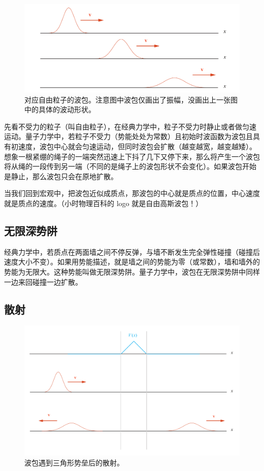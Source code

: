 \begin{figure}[ht]
\centering
\includegraphics[width=14cm]{./figures/QM02.pdf}
\caption{对应自由粒子的波包。注意图中波包仅画出了振幅，没画出上一张图中的具体的波动形状。} \label{QM0_fig2}
\end{figure}

先看不受力的粒子（叫自由粒子），在经典力学中，粒子不受力时静止或者做匀速运动。量子力学中，若粒子不受力（势能处处为常数）且初始时波函数为波包且具有初速度，波包中心就会匀速运动，但同时波包会扩散（越变越宽，越变越矮）。想象一根紧绷的绳子的一端突然迅速上下抖了几下又停下来，那么将产生一个波包将从绳的一段传到另一端（不同的是绳子上的波包形状不会变化）。如果波包开始是静止，那么波包只会在原地扩散。

当我们回到宏观中，把波包近似成质点，那波包的中心就是质点的位置，中心速度就是质点的速度。（小时物理百科的 logo 就是自由高斯波包！）

\subsection{无限深势阱}
经典力学中，若质点在两面墙之间不停反弹，与墙不断发生完全弹性碰撞（碰撞后速度大小不变）。如果用势能描述，就是墙之间的势能为零（或常数），墙和墙外的势能为无限大。这种势能叫做无限深势阱。量子力学中，波包在无限深势阱中同样一边来回碰撞一边扩散。

\subsection{散射}

\begin{figure}[ht]
\centering
\includegraphics[width=14cm]{./figures/QM03.pdf}
\caption{波包遇到三角形势垒后的散射。} \label{QM0_fig3}
\end{figure}

